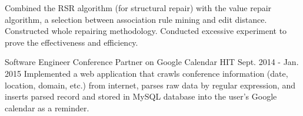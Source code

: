\begin{cventries}
{\begin{cvitems}
        \item{Combined the RSR algorithm (for structural repair) with the value repair algorithm, a selection between association rule mining and edit distance. Constructed whole repairing methodology. Conducted excessive experiment to prove the effectiveness and efficiency.}
      \end{cvitems}
    }
\vspace{-1em}
  \cventry
    {Software Engineer}
    {Conference Partner on Google Calendar}
    {HIT}
    {Sept. 2014 - Jan. 2015}
    {
		Implemented a web application that crawls conference information (date, location, domain, etc.) from internet, parses raw data by regular expression, and inserts parsed record and stored in MySQL database into the user’s Google calendar as a reminder.
    }

\end{cventries}
